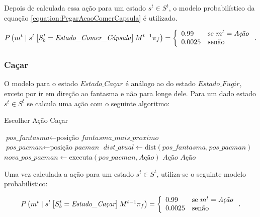 Depois de calculada essa ação para um estado $ s^t \in S^t $, o modelo probabilístico da equação \ref{equation:PegarAcaoComerCapsula} é utilizado.

\begin{equation} \label{equation:PegarAcaoComerCapsula}
    P \left( m^t \mid s^t \left[ S_b^t = \textit{Estado\_Comer\_Cápsula} \right] M^{t-1} \pi_f \right) = 
        \left\{
            \begin{array}{l l}
                0.99 & \text{se }m^t = \textit{Ação} \\
                0.0025 & \text{senão}
            \end{array}
        \right..
\end{equation}


\subsubsection*{Caçar}

O modelo para o estado $ \textit{Estado\_Caçar} $ é análogo ao do estado $ Estado\_Fugir $, exceto por ir em direção ao fantasma e não para longe dele. Para um dado estado $ s^t \in S^t $ se calcula uma ação com o seguinte algoritmo:

\begin{algorithm}[H]
	\caption{Escolher Ação Caçar} \label{algorithm:SelecaoDeAcaoCaçar}
	\begin{algorithmic}[1]
			\State $\textit{pos\_fantasma} \gets \text{posição }\textit{fantasma\_mais\_proximo} $
			\State $\textit{pos\_pacman} \gets \text{posição }\textit{pacman} $
			\State $\textit{dist\_atual} \gets \text{dist} \left( \textit{pos\_fantasma}, \textit{pos\_pacman} \right) $
				\State $\textit{nova\_pos\_pacman} \gets \text{executa} \left( \textit{pos\_pacman}, \textit{Ação} \right) $
					\State \Return $ \textit{Ação} $
				\EndIf 
			\EndFor
			\State \Return $ \textit{Ação} $
		\EndProcedure
	\end{algorithmic}
\end{algorithm}

Uma vez calculada a ação para um estado $ s^t \in S^t $, utiliza-se o seguinte modelo probabilístico:

\begin{equation}
    P \left( m^t \mid s^t \left[ S_b^t = \textit{Estado\_Caçar} \right] M^{t-1} \pi_f \right) = 
        \left\{
            \begin{array}{l l}
                0.99 & \text{se }m^t = \textit{Ação} \\
                0.0025 & \text{senão}
            \end{array}
        \right..
\end{equation}


